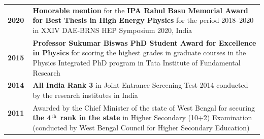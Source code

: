\documentclass[a4paper,11pt]{article}
\begin{document}
\begin{tabular}{ p{2cm} p{13cm} }
\textbf{2020} & {\textbf{Honorable mention} for the \textbf{IPA Rahul Basu Memorial Award for Best Thesis in High Energy Physics} for the period 2018--2020 in XXIV DAE-BRNS HEP Symposium 2020, India} \\
\textbf{2015} & {\textbf{Professor Sukumar Biswas PhD Student Award for Excellence in Physics} for scoring the highest grades in graduate courses in the Physics Integrated PhD program in Tata Institute of Fundamental Research} \\
\textbf{2014} \ & \textbf{All India Rank 3} in Joint Entrance Screening Test 2014 conducted by the research institutes in India  \\
\textbf{2011} \ & Awarded by the Chief Minister of the state of West Bengal for securing \textbf{the 4$^{\rm{th}}$ rank in the state} in Higher Secondary (10+2) Examination (conducted by West Bengal Council for Higher Secondary Education)  \\
\end{tabular}
\end{document}
